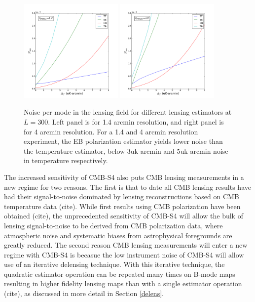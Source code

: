 \begin{figure}[h]
\includegraphics[width=0.45\textwidth]{ell300_1_40.pdf}
\includegraphics[width=0.45\textwidth]{ell300_4_00.pdf}
\caption{Noise per mode in the lensing field for different lensing estimators at $L = 300$.  Left panel is for 1.4 arcmin resolution, and right panel is for 4 arcmin resolution.  For a 1.4 and 4 arcmin resolution experiment, the EB polarization estimator yields lower noise than the temperature estimator, below 3uk-arcmin and 5uk-arcmin noise in temperature respectively.}
\end{figure}


The increased sensitivity of CMB-S4 also puts CMB lensing measurements in a new regime for two reasons.  The first is that to date all CMB lensing results have had their signal-to-noise dominated by lensing reconstructions based on CMB temperature data (cite).  While first results using CMB polarization have been obtained (cite), the unprecedented sensitivity of CMB-S4 will allow the bulk of lensing signal-to-noise to be derived from CMB polarization data, where atmospheric noise and systematic biases from astrophysical foregrounds are greatly reduced.  The second reason CMB lensing measurements will enter a new regime with CMB-S4 is becasue the low instrument noise of CMB-S4 will allow use of an iterative delensing technique.  With this iterative technique, the quadratic estimator operation can be repeated many times on B-mode maps resulting in higher fidelity lensing maps than with a single estimator operation (cite), as discussed in more detail in Section \ref{delens}.   





